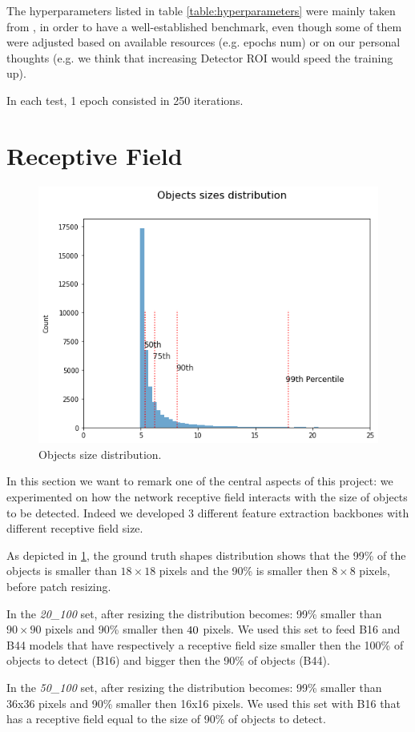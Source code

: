 \documentclass[a4paper,10pt]{report}
\begin{document}
The hyperparameters listed in table \ref{table:hyperparameters} were mainly taken from \cite{faster-rcnn}, in order to have a well-established benchmark, even though some of them were adjusted based on available resources (e.g. epochs num) or on our personal thoughts (e.g. we think that increasing Detector ROI would speed the training up).

In each test, 1 epoch consisted in 250 iterations.

\section{Receptive Field}\label{sec:receptive-field}
\begin{figure}[h]
  \center
  \includegraphics[width=0.65\linewidth]{objects_dist.png}
  \caption{Objects size distribution.}
  \label{fig:objects_dist}
\end{figure}
In this section we want to remark one of the central aspects of this project: we experimented on how the network receptive field interacts with the size of objects to be detected. Indeed we developed 3 different feature extraction backbones with different receptive field size.

As depicted in \ref{fig:objects_dist}, the ground truth shapes distribution shows that the 99\% of the objects is smaller than $18 \times 18$ pixels and the 90\% is smaller then $8 \times 8$ pixels, before patch resizing.

In the \emph{20\_100} set, after resizing the distribution becomes: 99\% smaller than $90 \times 90$ pixels and 90\% smaller then $40 \time 40$ pixels.
We used this set to feed B16 and B44 models that have respectively a receptive field size smaller then the 100\% of objects to detect (B16) and bigger then the 90\% of objects (B44).

In the \emph{50\_100} set, after resizing the distribution becomes: 99\% smaller than 36x36 pixels and 90\% smaller then 16x16 pixels.
We used this set with B16 that has a receptive field equal to the size of 90\% of objects to detect.
\end{document}
